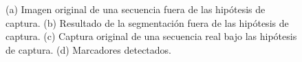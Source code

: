 \begin{figure}[ht!]
        \hspace{4.9 mm}
      \caption{%
       {(a)} Imagen original de una secuencia fuera de las hipótesis de captura. 
       (b) Resultado de la segmentación fuera de las hipótesis de captura.
       (c) Captura original de una secuencia real bajo las hipótesis de captura.
       (d) Marcadores detectados.}  
      \label{ejemploabelumbr2}
\end{figure}
\vspace{-0.6cm}